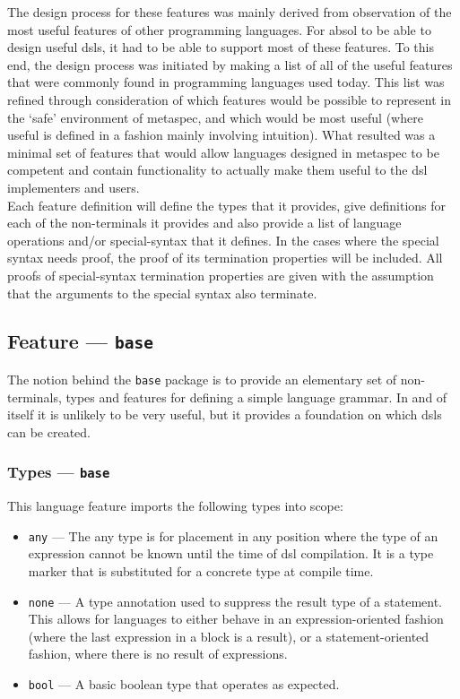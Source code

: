 The design process for these features was mainly derived from observation of the most useful features of other programming languages.
For \gls{absol} to be able to design useful \glspl{dsl}, it had to be able to support most of these features. 
To this end, the design process was initiated by making a list of all of the useful features that were commonly found in programming languages used today.
This list was refined through consideration of which features would be possible to represent in the `safe' environment of \gls{metaspec}, and which would be most useful (where useful is defined in a fashion mainly involving intuition).
What resulted was a minimal set of features that would allow languages designed in \gls{metaspec} to be competent and contain functionality to actually make them useful to the \gls{dsl} implementers and users. \\

Each feature definition will define the types that it provides, give definitions for each of the non-terminals it provides and also provide a list of language operations and/or special-syntax that it defines.
In the cases where the special syntax needs proof, the proof of its termination properties will be included. 
All proofs of special-syntax termination properties are given with the assumption that the arguments to the special syntax also terminate. 

\subsection{Feature --- \texttt{base}} %
\label{sub:feature_base}
The notion behind the \texttt{base} package is to provide an elementary set of non-terminals, types and features for defining a simple language grammar. 
In and of itself it is unlikely to be very useful, but it provides a foundation on which \glspl{dsl} can be created. 

\subsubsection{Types --- \texttt{base}} %
\label{ssub:types_base}
This language feature imports the following types into scope:
\begin{itemize}
    \item \texttt{any} --- The any type is for placement in any position where the type of an expression cannot be known until the time of \gls{dsl} compilation. 
    It is a type marker that is substituted for a concrete type at compile time.
    \item \texttt{none} --- A type annotation used to suppress the result type of a statement. 
    This allows for languages to either behave in an expression-oriented fashion (where the last expression in a block is a result), or a statement-oriented fashion, where there is no result of expressions.
    \item \texttt{bool} --- A basic boolean type that operates as expected. 
\end{itemize}

